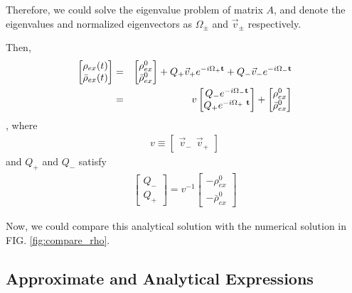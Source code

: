 \documentclass[aps,prd,twocolumn,amsmath,amssymb,groupedaddress]{revtex4-2}
\begin{document}
Therefore, we could solve the eigenvalue problem of matrix $A$, and denote the eigenvalues and normalized eigenvectors as $\Omega_\pm$ and $\vec{v}_\pm$ respectively.

Then,
\begin{eqnarray}
\label{equ:rho_ana}
\begin{bmatrix}
	\rho_{ex} (t)\\ \bar{\rho}_{ex} (t)
\end{bmatrix}
&=& \begin{bmatrix} 
	\rho^0_{ex} \\ \bar{\rho}^0_{ex}
\end{bmatrix} + 
Q_+ \vec{v}_+
e^{-i \Omega_{+} \bf{t}} +
Q_- \vec{v}_-
e^{-i \Omega_{-} \bf{t}} \nonumber \\
&=&
v
\begin{bmatrix}
	Q_-e^{-i \Omega_{-} \bf{t}} \\ Q_+e^{-i \Omega_{+} ~\bf{t}}
\end{bmatrix} + 
\begin{bmatrix} 
	\rho^0_{ex} \\ \bar{\rho}^0_{ex}
\end{bmatrix}
\end{eqnarray}
, where 
\begin{eqnarray}
v \equiv
\begin{bmatrix}
	\vec{v}_- ~~ \vec{v}_+
\end{bmatrix}
\end{eqnarray}
and $Q_+$ and $Q_-$ satisfy
\begin{eqnarray}
\label{equ:Q}
\begin{bmatrix}
	Q_- \\ Q_+
\end{bmatrix} =
v^{-1}
\begin{bmatrix}
	- \rho^0_{ex} \\ -\bar{\rho}^0_{ex}
\end{bmatrix}
\end{eqnarray}

Now, we could compare this analytical solution with the numerical solution in FIG. \ref{fig:compare_rho}.


\subsection{\label{subsec:approximation} Approximate and Analytical Expressions}
\end{document}
